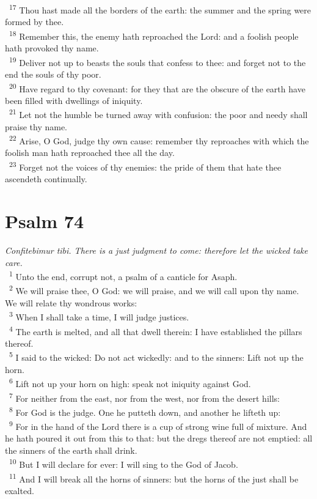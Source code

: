 \documentclass[a5paper,12pt]{article}
\begin{document}
\begin{multicols*}{2}
~\textsuperscript{17} Thou hast made all the borders of the earth: the summer and the spring were formed by thee.\\
~\textsuperscript{18} Remember this, the enemy hath reproached the Lord: and a foolish people hath provoked thy name.\\
~\textsuperscript{19} Deliver not up to beasts the souls that confess to thee: and forget not to the end the souls of thy poor.\\
~\textsuperscript{20} Have regard to thy covenant: for they that are the obscure of the earth have been filled with dwellings of iniquity.\\
~\textsuperscript{21} Let not the humble be turned away with confusion: the poor and needy shall praise thy name.\\
~\textsuperscript{22} Arise, O God, judge thy own cause: remember thy reproaches with which the foolish man hath reproached thee all the day.\\
~\textsuperscript{23} Forget not the voices of thy enemies: the pride of them that hate thee ascendeth continually.\\

\section{Psalm 74}
\label{sec:org9523302}
\emph{Confitebimur tibi. There is a just judgment to come: therefore let the wicked take care.}\\

~\textsuperscript{1} Unto the end, corrupt not, a psalm of a canticle for Asaph.\\
~\textsuperscript{2} We will praise thee, O God: we will praise, and we will call upon thy name. We will relate thy wondrous works:\\
~\textsuperscript{3} When I shall take a time, I will judge justices.\\
~\textsuperscript{4} The earth is melted, and all that dwell therein: I have established the pillars thereof.\\
~\textsuperscript{5} I said to the wicked: Do not act wickedly: and to the sinners: Lift not up the horn.\\
~\textsuperscript{6} Lift not up your horn on high: speak not iniquity against God.\\
~\textsuperscript{7} For neither from the east, nor from the west, nor from the desert hills:\\
~\textsuperscript{8} For God is the judge. One he putteth down, and another he lifteth up:\\
~\textsuperscript{9} For in the hand of the Lord there is a cup of strong wine full of mixture. And he hath poured it out from this to that: but the dregs thereof are not emptied: all the sinners of the earth shall drink.\\
~\textsuperscript{10} But I will declare for ever: I will sing to the God of Jacob.\\
~\textsuperscript{11} And I will break all the horns of sinners: but the horns of the just shall be exalted.\\


\end{multicols*}
\end{document}
